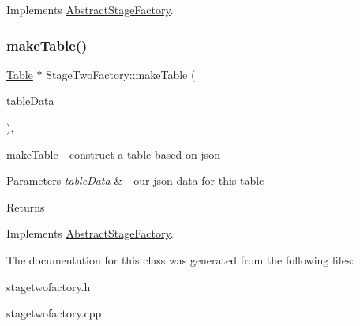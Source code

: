 Implements \mbox{\hyperlink{class_abstract_stage_factory_a6ce57859e00b135049e3b995b7dfc94d}{Abstract\+Stage\+Factory}}.

\mbox{\label{class_stage_two_factory_aa532818e02bed0ea1f5c79a1a1487e71}} 
\subsubsection{\texorpdfstring{make\+Table()}{makeTable()}}
{\footnotesize\ttfamily \mbox{\hyperlink{class_table}{Table}} $\ast$ Stage\+Two\+Factory\+::make\+Table (\begin{DoxyParamCaption}\item[{const Q\+Json\+Object \&}]{table\+Data }\end{DoxyParamCaption})\hspace{0.3cm}{\ttfamily [override]}, {\ttfamily [virtual]}}



make\+Table -\/ construct a table based on json 


\begin{DoxyParams}{Parameters}
{\em table\+Data} & -\/ our json data for this table \\
\hline
\end{DoxyParams}
\begin{DoxyReturn}{Returns}

\end{DoxyReturn}


Implements \mbox{\hyperlink{class_abstract_stage_factory_a539c855ce9a09e08b7fcb3ffa7f0d3fd}{Abstract\+Stage\+Factory}}.



The documentation for this class was generated from the following files\+:\begin{DoxyCompactItemize}
\item 
stagetwofactory.\+h\item 
stagetwofactory.\+cpp\end{DoxyCompactItemize}
